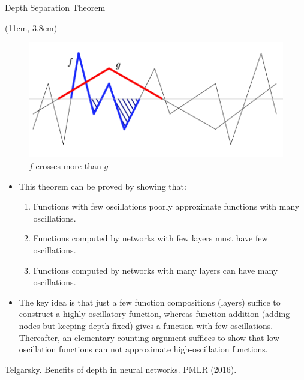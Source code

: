 \documentclass[serif, aspectratio=169]{beamer}
\begin{document}
\begin{frame}{Depth Separation Theorem}
	\begin{textblock*}{5cm}(11cm, 3.8cm)
		\begin{figure}
			\includegraphics[keepaspectratio, scale=0.14]{pic/depth}
			\caption*{$f$ crosses more than $g$}
		\end{figure}
	\end{textblock*}
	
	\begin{itemize}
		\item This theorem can be proved by showing that:
		\begin{enumerate}
			\item Functions with few oscillations poorly approximate functions with many oscillations.
			\item Functions computed by networks with few layers must have few oscillations.
			\item Functions computed by networks with many layers can have many oscillations.
		\end{enumerate}
		\vspace{0.3cm}
		\item The key idea is that just a few function compositions \newline (layers) suffice to construct a highly oscillatory function, \newline whereas function addition (adding nodes but keeping \newline  depth fixed) gives a function with few oscillations. \newline Thereafter, an elementary counting argument suffices to \newline show that low-oscillation functions can not approximate \newline
		high-oscillation functions.
	\end{itemize}
	\vspace{0.9cm}
	\scriptsize Telgarsky. Benefits of depth in neural networks. PMLR (2016).
\end{frame}
\end{document}
